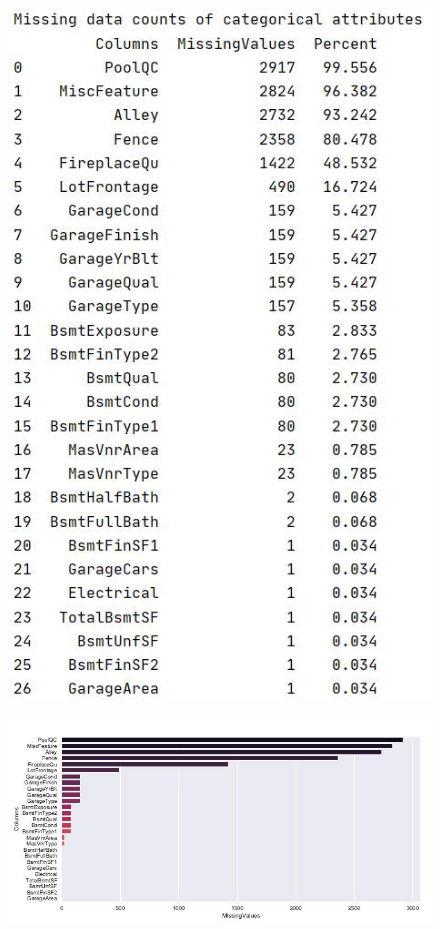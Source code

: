 \documentclass[onecolumn]{article}
\begin{document}
\begin{figure}[h]
\centering
\begin{minipage}{.3\textwidth}
  \centering
  \includegraphics[width=.9\linewidth]{missing_values.jpg}
  \label{fig:missing_values}
\end{minipage}%
\begin{minipage}{.7\textwidth}
  \centering
  \includegraphics[width=.9\linewidth]{missing_values_2.jpg}
  \label{fig:missing_values_2}
\end{minipage}
\end{figure}
\end{document}
